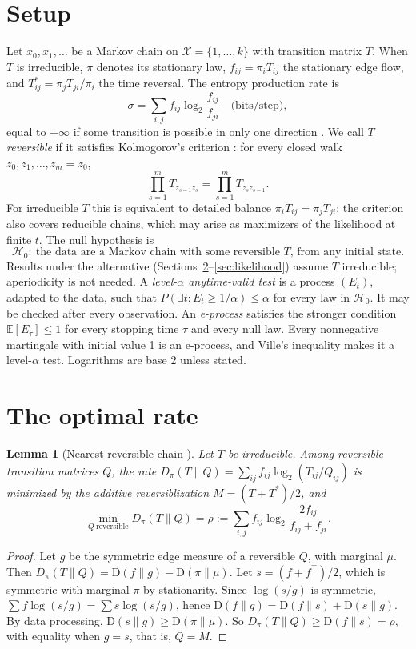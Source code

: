 \documentclass[11pt]{article}
\newtheorem{lemma}[theorem]{Lemma}
\theoremstyle{definition}
\theoremstyle{remark}
\newcommand{\X}{\mathcal{X}}
\newcommand{\E}{\mathbb{E}}
\newcommand{\KL}{\mathrm{D}}
\newcommand{\Hnull}{\mathcal{H}_0}
\begin{document}
\section{Setup}\label{sec:setup}

Let $x_0,x_1,\dots$ be a Markov chain on $\X=\{1,\dots,k\}$ with transition matrix $T$. When $T$ is irreducible, $\pi$ denotes its stationary law, $f_{ij}=\pi_iT_{ij}$ the stationary edge flow, and $T^\ast_{ij}=\pi_jT_{ji}/\pi_i$ the time reversal. The entropy production rate is
\[
\sigma=\sum_{i,j}f_{ij}\log_2\frac{f_{ij}}{f_{ji}}\quad\text{(bits/step)},
\]
equal to $+\infty$ if some transition is possible in only one direction \cite{gaspard2004}. We call $T$ \emph{reversible} if it satisfies Kolmogorov's criterion \cite{kelly1979}: for every closed walk $z_0,z_1,\dots,z_m=z_0$,
\[
\prod_{s=1}^mT_{z_{s-1}z_s}=\prod_{s=1}^mT_{z_sz_{s-1}}.
\]
For irreducible $T$ this is equivalent to detailed balance $\pi_iT_{ij}=\pi_jT_{ji}$; the criterion also covers reducible chains, which may arise as maximizers of the likelihood at finite $t$. The null hypothesis is
\[
\Hnull:\ \text{the data are a Markov chain with some reversible $T$, from any initial state.}
\]
Results under the alternative (Sections~\ref{sec:rate}--\ref{sec:likelihood}) assume $T$ irreducible; aperiodicity is not needed.
A \emph{level-$\alpha$ anytime-valid test} is a process $(E_t)$, adapted to the data, such that $P(\exists t:E_t\ge1/\alpha)\le\alpha$ for every law in $\Hnull$. It may be checked after every observation. An \emph{e-process} satisfies the stronger condition $\E[E_\tau]\le1$ for every stopping time $\tau$ and every null law. Every nonnegative martingale with initial value 1 is an e-process, and Ville's inequality makes it a level-$\alpha$ test. Logarithms are base 2 unless stated.

\section{The optimal rate}\label{sec:rate}

\begin{lemma}[Nearest reversible chain \cite{wolfer2021}]\label{lem:projection}
Let $T$ be irreducible. Among reversible transition matrices $Q$, the rate $D_\pi(T\|Q)=\sum_{ij}f_{ij}\log_2(T_{ij}/Q_{ij})$ is minimized by the additive reversiblization $M=(T+T^\ast)/2$, and
\[
\min_{Q\ \text{reversible}}D_\pi(T\|Q)=\rho:=\sum_{i,j}f_{ij}\log_2\frac{2f_{ij}}{f_{ij}+f_{ji}}.
\]
\end{lemma}
\begin{proof}
Let $g$ be the symmetric edge measure of a reversible $Q$, with marginal $\mu$. Then $D_\pi(T\|Q)=\KL(f\|g)-\KL(\pi\|\mu)$. Let $s=(f+f^\top)/2$, which is symmetric with marginal $\pi$ by stationarity. Since $\log(s/g)$ is symmetric, $\sum f\log(s/g)=\sum s\log(s/g)$, hence $\KL(f\|g)=\KL(f\|s)+\KL(s\|g)$. By data processing, $\KL(s\|g)\ge\KL(\pi\|\mu)$. So $D_\pi(T\|Q)\ge\KL(f\|s)=\rho$, with equality when $g=s$, that is, $Q=M$.
\end{proof}
\end{document}
